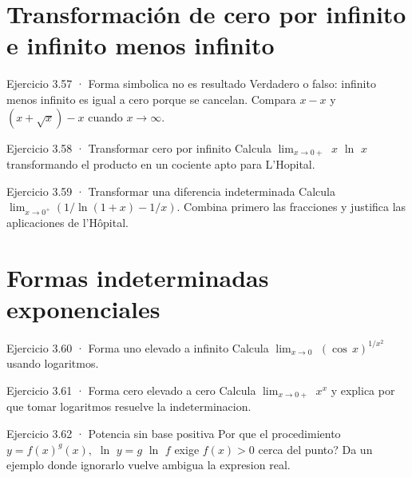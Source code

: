 \documentclass[10pt,a4paper,oneside,openany]{book}
\begin{document}
\section{Transformación de cero por infinito e infinito menos infinito}
\begin{PSevenExerciseFixed}{Ejercicio 3.57 · Forma simbolica no es resultado}
Verdadero o falso: infinito menos infinito es igual a cero porque se cancelan. Compara \(x-x\) y \((x+\sqrt{x})-x\) cuando \(x\to \infty \).
\end{PSevenExerciseFixed}
\begin{PSevenExerciseFixed}{Ejercicio 3.58 · Transformar cero por infinito}
Calcula \(\lim_{x\to 0+}\) \(x\) \(\ln\) \(x\) transformando el producto en un cociente apto para L'Hopital.
\end{PSevenExerciseFixed}
\begin{PSevenExerciseFixed}{Ejercicio 3.59 · Transformar una diferencia indeterminada}
Calcula \(\lim_{x\to0^+}(1/\ln(1+x)-1/x)\). Combina primero las fracciones y justifica las aplicaciones de l'Hôpital.
\end{PSevenExerciseFixed}
\section{Formas indeterminadas exponenciales}
\begin{PSevenExerciseFixed}{Ejercicio 3.60 · Forma uno elevado a infinito}
Calcula \(\lim_{x\to 0}\) \((\cos\,x)^{1/x^{2}}\) usando logaritmos.
\end{PSevenExerciseFixed}
\begin{PSevenExerciseFixed}{Ejercicio 3.61 · Forma cero elevado a cero}
Calcula \(\lim_{x\to 0+}\) \(x^x\) y explica por que tomar logaritmos resuelve la indeterminacion.
\end{PSevenExerciseFixed}
\begin{PSevenExerciseFixed}{Ejercicio 3.62 · Potencia sin base positiva}
Por que el procedimiento \(y=f(x)^g(x),\) \(\ln\) \(y=g\) \(\ln\) \(f\) exige \(f(x)>0\) cerca del punto? Da un ejemplo donde ignorarlo vuelve ambigua la expresion real.
\end{PSevenExerciseFixed}
\end{document}

